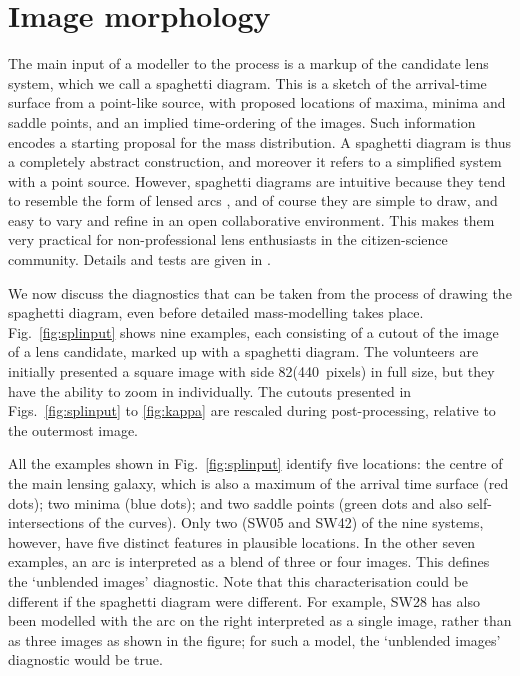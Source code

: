 
\section{Image morphology}
\label{sec:morph}

The main input of a modeller to the process is a markup of the
candidate lens system, which we call a spaghetti diagram.  This is a
sketch of the arrival-time surface from a point-like source, with
proposed locations of maxima, minima and saddle points, and an implied
time-ordering of the images.  Such information encodes a starting
proposal for the mass distribution.  A spaghetti diagram is thus a
completely abstract construction, and moreover it refers to a
simplified system with a point source.  However, spaghetti diagrams
are intuitive because they tend to resemble the form of lensed arcs
\citep[see fig.3 of][]{2008MNRAS.383..857F}, and of course they are
simple to draw, and easy to vary and refine in an open collaborative
environment. This makes them very practical for non-professional lens
enthusiasts in the citizen-science community.  Details and tests are
given in \citet{2015MNRAS.447.2170K}.

We now discuss the diagnostics that can be taken from the process of
drawing the spaghetti diagram, even before detailed mass-modelling
takes place.  Fig.~\ref{fig:splinput} shows nine examples, each
consisting of a cutout of the \SW  image of a lens candidate,
marked up with a spaghetti diagram.
The volunteers are initially presented a square image with side
82\arcsec (440~pixels) in full size, but they have the
ability to zoom in individually.
The cutouts presented in Figs.~\ref{fig:splinput} to \ref{fig:kappa}
are rescaled during post-processing, relative to the outermost image.

All the examples shown in Fig.~\ref{fig:splinput} identify five locations:
the centre of the main lensing galaxy, which is also a maximum of the
arrival time surface (red dots); two minima (blue dots); and two
saddle points (green dots and also self-intersections of the curves).
Only two (SW05 and SW42) of the nine systems, however, have five
distinct features in plausible locations.  In the other seven
examples, an arc is interpreted as a blend of three or four images.
This defines the `unblended images' diagnostic.  Note that this
characterisation could be different if the spaghetti diagram were 
different.  For example, SW28 has also been modelled with the arc on
the right interpreted as a single image, rather than as three images
as shown in the figure; for such a model, the `unblended images'
diagnostic would be true.

